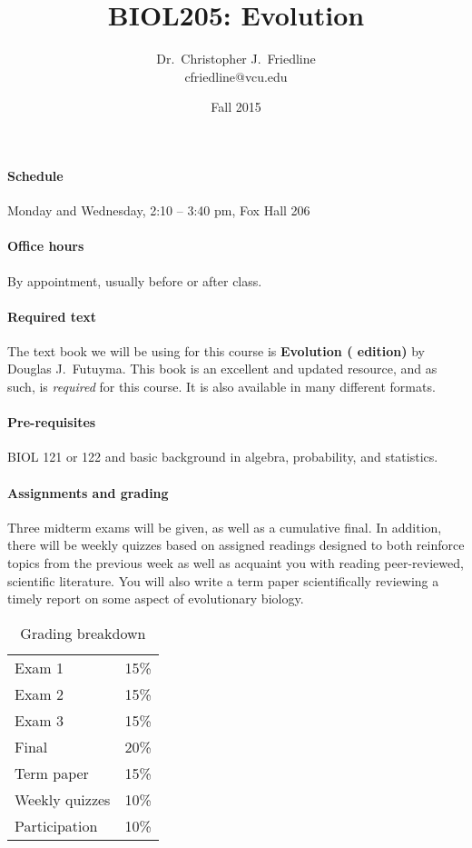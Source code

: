 \documentclass{article}
\title{BIOL205: Evolution}
\author{Dr.\ Christopher J.\ Friedline \\ cfriedline@vcu.edu}
\date{Fall 2015}
\begin{document}
\maketitle
\linespread{1.3}

\paragraph{Schedule}
Monday and Wednesday, 2:10 -- 3:40 pm, Fox Hall 206

\paragraph{Office hours}
By appointment, usually before or after class.

\paragraph{Required text}
The text book we will be using for this course is \textbf{Evolution (
edition)} by Douglas J.\ Futuyma. This book is an excellent and updated
resource,
and as such, is \textit{required} for this course. It is also available in many
different formats.

\paragraph{Pre-requisites}
BIOL 121 or 122 and basic background in algebra, probability, and statistics.

\paragraph{Assignments and grading}
Three midterm exams will be given, as well
as a cumulative final.  In addition, there will be weekly quizzes based on
assigned readings designed to both reinforce topics from the previous week as
well as acquaint you with reading peer-reviewed, scientific literature.  You
will also write a term paper scientifically reviewing a timely report on some
aspect of evolutionary biology.

\begin{table}[h]
\centering
\caption*{Grading breakdown}

\begin{tabular}{l|r}
Exam 1          &   15\% \\
Exam 2          &   15\% \\
Exam 3			& 	15\% \\
Final           &   20\% \\ 
Term paper      &   15\% \\
Weekly quizzes  &	10\% \\
Participation   &   10\% \\

\end{tabular}

\end{table}
\end{document}

